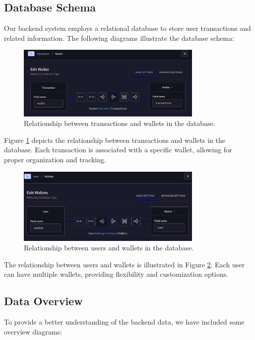 \subsection{Database Schema}
Our backend system employs a relational database to store user transactions and related information. The following diagrams illustrate the database schema:

\begin{figure}[htbp]
  \centering
  \includegraphics[width=0.8\textwidth]{Strapi/Rel/TransactionToWallet.png}
  \caption{Relationship between transactions and wallets in the database.}
  \label{fig:transaction_wallet_relationship}
\end{figure}

Figure \ref{fig:transaction_wallet_relationship} depicts the relationship between transactions and wallets in the database. Each transaction is associated with a specific wallet, allowing for proper organization and tracking.

\begin{figure}[htbp]
  \centering
  \includegraphics[width=0.8\textwidth]{Strapi/Rel/UserToWallet.png}
  \caption{Relationship between users and wallets in the database.}
  \label{fig:user_wallet_relationship}
\end{figure}

The relationship between users and wallets is illustrated in Figure \ref{fig:user_wallet_relationship}. Each user can have multiple wallets, providing flexibility and customization options.

\subsection{Data Overview}
To provide a better understanding of the backend data, we have included some overview diagrams:

